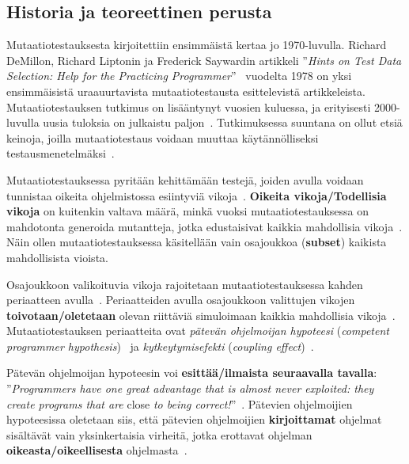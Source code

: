 \documentclass[finnish, grading]{tktltiki2}
\theoremstyle{definition}
\theoremstyle{remark}
\begin{document}
\subsection{Historia ja teoreettinen perusta}

Mutaatiotestauksesta kirjoitettiin ensimmäistä kertaa jo 1970-luvulla. Richard DeMillon, Richard Liptonin ja Frederick Saywardin artikkeli ''\textit{Hints on Test Data Selection: Help for the Practicing Programmer}''~\cite{DeMillo:Lipton:Sayward:1978} vuodelta 1978 on yksi ensimmäisistä uraauurtavista mutaatiotestausta esittelevistä artikkeleista. Mutaatiotestauksen tutkimus on lisääntynyt vuosien kuluessa, ja erityisesti 2000-luvulla uusia tuloksia on julkaistu paljon~\cite[s. 1102]{Offutt:2011}. Tutkimuksessa suuntana on ollut etsiä keinoja, joilla mutaatiotestaus voidaan muuttaa käytännölliseksi testausmenetelmäksi~\cite[s. 649]{Jia:Harman:2011}. 

Mutaatiotestauksessa pyritään kehittämään testejä, joiden avulla voidaan tunnistaa oikeita ohjelmistossa esiintyviä vikoja~\cite[s. 650]{Jia:Harman:2011}. \textbf{Oikeita vikoja/Todellisia vikoja} on kuitenkin valtava määrä, minkä vuoksi mutaatiotestauksessa on mahdotonta generoida mutantteja, jotka edustaisivat kaikkia mahdollisia vikoja~\cite[s. 650]{Jia:Harman:2011}. Näin ollen mutaatiotestauksessa käsitellään vain osajoukkoa (\textbf{subset}) kaikista mahdollisista vioista.

Osajoukkoon valikoituvia vikoja rajoitetaan mutaatiotestauksessa kahden periaatteen avulla~\cite[s. 5]{Offutt:1992:Coupling}. Periaatteiden avulla osajoukkoon valittujen vikojen \textbf{toivotaan/oletetaan} olevan riittäviä simuloimaan kaikkia mahdollisia vikoja~\cite[s. 650]{Jia:Harman:2011}. Mutaatiotestauksen periaatteita ovat \textit{pätevän ohjelmoijan hypoteesi} (\textit{competent programmer hypothesis})~\cite[s. 34]{DeMillo:Lipton:Sayward:1978} ja \textit{kytkeytymisefekti} (\textit{coupling effect})~\cite[s. 35]{DeMillo:Lipton:Sayward:1978}.

Pätevän ohjelmoijan hypoteesin voi \textbf{esittää/ilmaista seuraavalla tavalla}: ''\textit{Programmers have one great advantage that is almost never exploited: they create programs that are} close \textit{to being correct!}''~\cite[s. 34]{DeMillo:Lipton:Sayward:1978}. Pätevien ohjelmoijien hypoteesissa oletetaan siis, että pätevien ohjelmoijien \textbf{kirjoittamat} ohjelmat sisältävät vain yksinkertaisia virheitä, jotka erottavat ohjelman \textbf{oikeasta/oikeellisesta} ohjelmasta~\cite[s. 5]{Offutt:1992:Coupling}.
\end{document}
